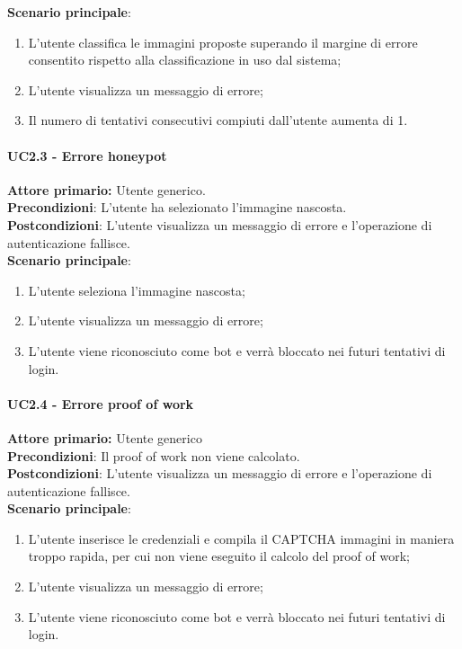 \textbf{Scenario principale}:
\begin{enumerate}
    \item L'utente classifica le immagini proposte superando il margine di errore consentito rispetto alla classificazione in uso dal sistema;
	\item L’utente visualizza un messaggio di errore;
	\item Il numero di tentativi consecutivi compiuti dall’utente aumenta di 1.
\end{enumerate}

\paragraph{UC2.3 - Errore honeypot}
\textbf{Attore primario:} Utente generico.\\
\textbf{Precondizioni}: L’utente ha selezionato l'immagine nascosta.\\
\textbf{Postcondizioni}: L’utente visualizza un messaggio di errore e l’operazione di autenticazione fallisce.\\

\textbf{Scenario principale}:
\begin{enumerate}
    \item L'utente seleziona l'immagine nascosta;
	\item L’utente visualizza un messaggio di errore;
	\item L'utente viene riconosciuto come bot e verrà bloccato nei futuri tentativi di login.
\end{enumerate}

\paragraph{UC2.4 - Errore proof of work}
\textbf{Attore primario:} Utente generico\\
\textbf{Precondizioni}: Il proof of work non viene calcolato.\\
\textbf{Postcondizioni}:  L’utente visualizza un messaggio di errore e l’operazione di autenticazione fallisce.\\

\textbf{Scenario principale}:
\begin{enumerate}
    \item L'utente inserisce le credenziali e compila il CAPTCHA immagini in maniera troppo rapida, per cui non viene eseguito il calcolo del proof of work;
	\item L’utente visualizza un messaggio di errore;
	\item L'utente viene riconosciuto come bot e verrà bloccato nei futuri tentativi di login.
\end{enumerate}

